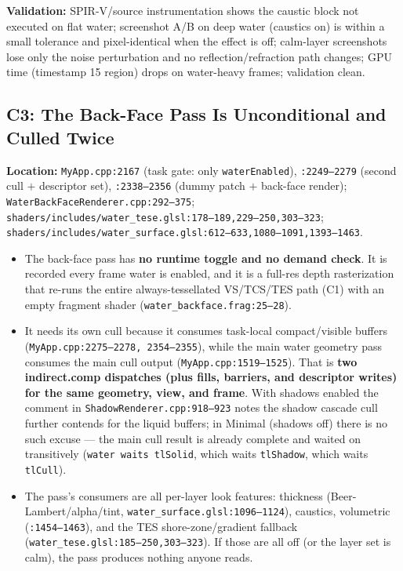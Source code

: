 \documentclass[11pt,a4paper]{article}
\begin{document}
\begin{tcolorbox}[promptbox={Prompt: Evaluate the Wave Field Once and Gate the Optional Noise}]
\textbf{Validation:} SPIR-V/source instrumentation shows the caustic block not executed on flat water; screenshot A/B on deep water (caustics on) is within a small tolerance
and pixel-identical when the effect is off; calm-layer screenshots lose only the noise perturbation and no reflection/refraction path changes; GPU time (timestamp 15 region)
drops on water-heavy frames; validation clean.
\end{tcolorbox}

\subsection{C3: The Back-Face Pass Is Unconditional and Culled Twice}

\textbf{Location:} \texttt{MyApp.cpp:2167} (task gate: only \texttt{waterEnabled}), \texttt{:2249--2279} (second cull $+$ descriptor set), \texttt{:2338--2356}
(dummy patch $+$ back-face render); \texttt{WaterBackFaceRenderer.cpp:292--375}; \texttt{shaders/includes/water\_tese.glsl:178--189,229--250,303--323};
\texttt{shaders/includes/water\_surface.glsl:612--633,1080--1091,1393--1463}.

\begin{itemize}
    \item The back-face pass has \textbf{no runtime toggle and no demand check}. It is recorded every frame water is enabled, and it is a full-res depth rasterization that
    re-runs the entire always-tessellated VS/TCS/TES path (C1) with an empty fragment shader (\texttt{water\_backface.frag:25--28}).
    \item It needs its own cull because it consumes task-local compact/visible buffers (\texttt{MyApp.cpp:2275--2278, 2354--2355}), while the main water geometry pass
    consumes the main cull output (\texttt{MyApp.cpp:1519--1525}). That is \textbf{two indirect.comp dispatches (plus fills, barriers, and descriptor writes) for the same
    geometry, view, and frame}. With shadows enabled the comment in \texttt{ShadowRenderer.cpp:918--923} notes the shadow cascade cull further contends for the liquid buffers;
    in Minimal (shadows off) there is no such excuse --- the main cull result is already complete and waited on transitively (\texttt{water waits tlSolid}, which waits
    \texttt{tlShadow}, which waits \texttt{tlCull}).
    \item The pass's consumers are all per-layer look features: thickness (Beer-Lambert/alpha/tint, \texttt{water\_surface.glsl:1096--1124}), caustics, volumetric
    (\texttt{:1454--1463}), and the TES shore-zone/gradient fallback (\texttt{water\_tese.glsl:185--250,303--323}). If those are all off (or the layer set is calm), the pass
    produces nothing anyone reads.
\end{itemize}
\end{document}
